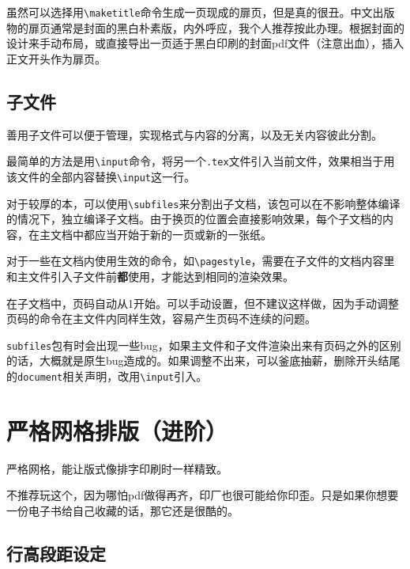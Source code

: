 \documentclass[10pt,openany]{book}
\begin{document}
虽然可以选择用\texttt{\textbackslash{}maketitle}命令生成一页现成的扉页，但是真的很丑。中文出版物的扉页通常是封面的黑白朴素版，内外呼应，我个人推荐按此办理。根据封面的设计来手动布局，或直接导出一页适于黑白印刷的封面pdf文件（注意出血），插入正文开头作为扉页。



\section{子文件}

善用子文件可以便于管理，实现格式与内容的分离，以及无关内容彼此分割。

最简单的方法是用\texttt{\textbackslash{}input}命令，将另一个\texttt{.tex}文件引入当前文件，效果相当于用该文件的全部内容替换\texttt{\textbackslash{}input}这一行。



对于较厚的本，可以使用\texttt{\textbackslash{}subfiles}来分割出子文档，该包可以在不影响整体编译的情况下，独立编译子文档。由于换页的位置会直接影响效果，每个子文档的内容，在主文档中都应当开始于新的一页或新的一张纸。



对于一些在文档内使用生效的命令，如\texttt{\textbackslash{}pagestyle}，需要在子文件的文档内容里和主文件引入子文件前\textbf{都}使用，才能达到相同的渲染效果。

在子文档中，页码自动从1开始。可以手动设置，但不建议这样做，因为手动调整页码的命令在主文件内同样生效，容易产生页码不连续的问题。

\texttt{subfiles}包有时会出现一些bug，如果主文件和子文件渲染出来有页码之外的区别的话，大概就是原生bug造成的。如果调整不出来，可以釜底抽薪，删除开头结尾的\texttt{document}相关声明，改用\texttt{\textbackslash{}input}引入。

\chapter{严格网格排版（进阶）}

严格网格，能让版式像排字印刷时一样精致。

不推荐玩这个，因为哪怕pdf做得再齐，印厂也很可能给你印歪。只是如果你想要一份电子书给自己收藏的话，那它还是很酷的。

\section{行高段距设定}
\end{document}
